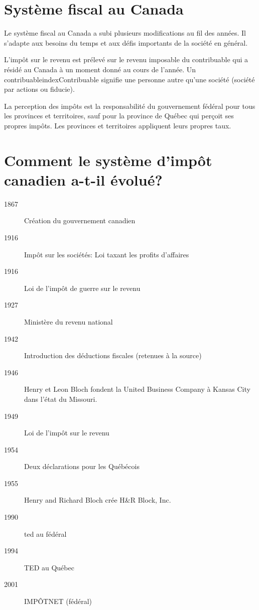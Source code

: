 \section{Système fiscal au Canada}
\begin{intro}
	Le système fiscal au Canada a subi plusieurs modifications au fil des années.  Il s'adapte aux besoins du temps et aux défis importants de la société en général.
\end{intro}
L'impôt sur le revenu est prélevé sur le \og revenu imposable\fg{} du contribuable qui a résidé au Canada à un moment donné au cours de l'année. Un \og contribuable\fg{}index{Contribuable} signifie une personne autre qu'une société (société par actions ou fiducie).

La perception des impôts est la responsabilité du gouvernement fédéral pour tous les provinces et territoires, sauf pour la province de Québec qui perçoit ses propres impôts. Les provinces et territoires appliquent leurs propres taux.



\section{Comment le système d'impôt canadien a-t-il évolué?}
\begin{description}
	\item[1867] Création du gouvernement canadien
	\item[1916] Impôt sur les sociétés: Loi taxant les profits d'affaires
	\item[1916] Loi de l'impôt de guerre sur le revenu
	\item[1927] Ministère du revenu national
	\item[1942] Introduction des déductions fiscales (retenues à la source)
	\item[\color{ForestGreen}1946] Henry et Leon Bloch fondent la United Business Company à Kansas City dans l'état du Missouri.
	\item[1949] Loi de l'impôt sur le revenu
	\item[1954] Deux déclarations pour les Québécois
	\item[\color{ForestGreen}1955] Henry and Richard Bloch crée H\&R Block, Inc.
	\item[1990] \acrfull{ted} au fédéral
	\item[1994] TED au Québec
	\item[2001] IMPÔTNET (fédéral)
\end{description}

